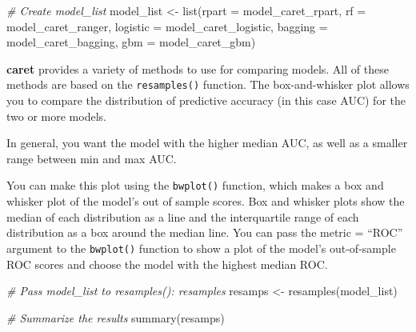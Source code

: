 \documentclass[
]{book}
\newenvironment{Shaded}{\begin{snugshade}}{\end{snugshade}}
\newcommand{\AttributeTok}[1]{\textcolor[rgb]{0.77,0.63,0.00}{#1}}
\newcommand{\CommentTok}[1]{\textcolor[rgb]{0.56,0.35,0.01}{\textit{#1}}}
\newcommand{\FunctionTok}[1]{\textcolor[rgb]{0.00,0.00,0.00}{#1}}
\newcommand{\NormalTok}[1]{#1}
\newcommand{\OtherTok}[1]{\textcolor[rgb]{0.56,0.35,0.01}{#1}}
\begin{document}
\begin{Shaded}
\begin{Highlighting}[]
\CommentTok{\# Create model\_list}
\NormalTok{model\_list }\OtherTok{\textless{}{-}} \FunctionTok{list}\NormalTok{(}\AttributeTok{rpart =}\NormalTok{ model\_caret\_rpart, }
                   \AttributeTok{rf =}\NormalTok{ model\_caret\_ranger,}
                   \AttributeTok{logistic =}\NormalTok{ model\_caret\_logistic, }
                   \AttributeTok{bagging =}\NormalTok{ model\_caret\_bagging,}
                   \AttributeTok{gbm =}\NormalTok{ model\_caret\_gbm)}
\end{Highlighting}
\end{Shaded}

\textbf{caret} provides a variety of methods to use for comparing models. All of these methods are based on the \texttt{resamples()} function. The box-and-whisker plot allows you to compare the distribution of predictive accuracy (in this case AUC) for the two or more models.

In general, you want the model with the higher median AUC, as well as a smaller range between min and max AUC.

You can make this plot using the \texttt{bwplot()} function, which makes a box and whisker plot of the model's out of sample scores. Box and whisker plots show the median of each distribution as a line and the interquartile range of each distribution as a box around the median line. You can pass the metric = ``ROC'' argument to the \texttt{bwplot()} function to show a plot of the model's out-of-sample ROC scores and choose the model with the highest median ROC.

\begin{Shaded}
\begin{Highlighting}[]
\CommentTok{\# Pass model\_list to resamples(): resamples}
\NormalTok{resamps }\OtherTok{\textless{}{-}} \FunctionTok{resamples}\NormalTok{(model\_list)}

\CommentTok{\# Summarize the results}
\FunctionTok{summary}\NormalTok{(resamps)}
\end{Highlighting}
\end{Shaded}
\end{document}

